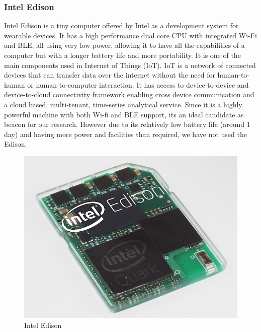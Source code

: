 \subsubsection{Intel Edison}

Intel Edison\cite{intel-edision} is a tiny computer offered by Intel
as a development system for wearable devices. It has a high performance
dual core CPU with integrated Wi-Fi and BLE, all using very low power, allowing it to have all the capabilities of a computer but with a longer battery
life and more portability. It is one of the main components used in
Internet of Things (IoT). IoT is a network of connected devices that can transfer data over the internet without the need for human-to-human or human-to-computer interaction\cite{iot}. It has access to device-to-device and device-to-cloud
connectivity framework enabling cross device communication and a
cloud based, multi-tenant, time-series analytical service\cite{intel-edison}. Since it
is a highly powerful machine with both Wi-fi and BLE support, its
an ideal candidate as beacon for our research. However
due to its relatively low battery life (around 1 day) and having
more power and facilities than required, we have not used the Edison.


\begin{figure}[H]
\centering
\includegraphics{images/intel-edison-560}
\protect\caption{Intel Edison}
\end{figure}



